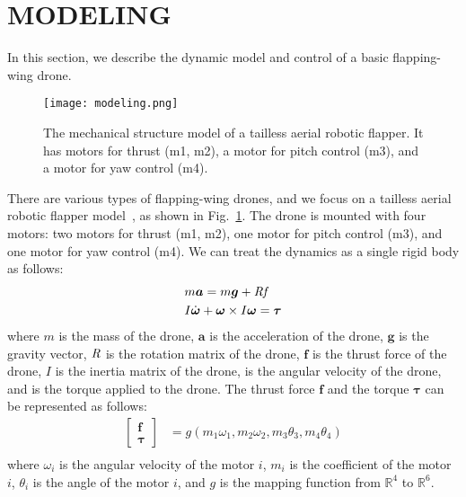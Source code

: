 \section{MODELING}
\label{sec:modeling}
In this section, we describe the dynamic model and control of a basic flapping-wing drone.
\begin{figure}[t]
    \centering
    \texttt{[image: modeling.png]}
    \caption{The mechanical structure model of a tailless aerial robotic flapper. It has motors for thrust (m1, m2), a motor for pitch control (m3), and a motor for yaw control (m4).}
    \label{figure:modeling}
  \end{figure}
There are various types of flapping-wing drones, and we focus on a tailless aerial robotic flapper model~\cite{karasek2018tailless}, as shown in Fig.~\ref{figure:modeling}.
The drone is mounted with four motors: two motors for thrust (m1, m2), one motor for pitch control (m3), and one motor for yaw control (m4).
We can treat the dynamics as a single rigid body as follows:
\begin{equation}
    \begin{aligned}
      &m\bm{a} = m\bm{g} + \it{R}\bm{f}\\
      &I\dot{\bm{\omega}} + \bm{\omega} \times I\bm{\omega} = \bm{\tau}
    \end{aligned}
\end{equation}
where $m$ is the mass of the drone, 
$\bm{a}$ is the acceleration of the drone,
$\bm{g}$ is the gravity vector,
$\it{R}$ is the rotation matrix of the drone,
$\bm{f}$ is the thrust force of the drone,
$I$ is the inertia matrix of the drone, 
\bm{$\omega$} is the angular velocity of the drone, 
and \bm{$\tau$} is the torque applied to the drone.
The thrust force $\bm{f}$ and the torque $\bm{\tau}$ can be represented as follows:
\begin{equation}
  \label{eq:control}
  \begin{aligned}
    \begin{bmatrix}
      \bm{f}\\
      \bm{\tau}
    \end{bmatrix}
    &=
    g(m_1\omega_1, m_2\omega_2, m_3\theta_3, m_4\theta_4)\\
  \end{aligned}
\end{equation}
where $\omega_i$ is the angular velocity of the motor $i$, $m_i$ is the coefficient of the motor $i$, $\theta_i$ is the angle of the motor $i$, and $g$ is the mapping function from $\mathbb{R}^4$ to $\mathbb{R}^6$.
